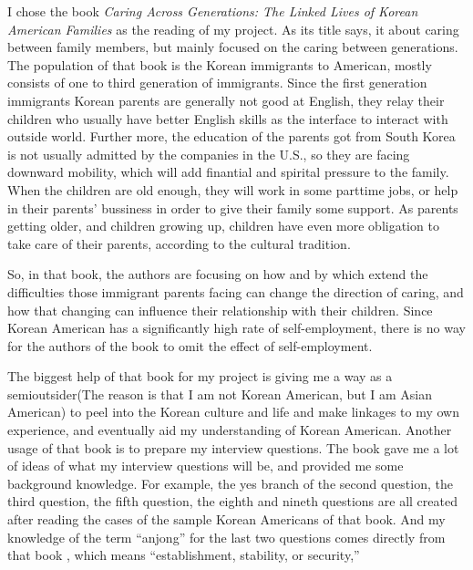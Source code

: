 I chose the book \emph{Caring Across Generations: The Linked Lives of Korean
American Families} as the reading of my project. As its title says, it about
caring between family members, but mainly focused on the caring between
generations. The population of that book is the Korean immigrants to American,
mostly consists of one to third generation of immigrants. Since the first
generation immigrants Korean parents are generally not good at English, they
relay their children who usually have better English skills as the interface to
interact with outside world. Further more, the education of the parents got from
South Korea is not usually admitted by the companies in the U.S., so they are
facing downward mobility, which will add finantial and spirital pressure to the
family. When the children are old enough, they will work in some parttime jobs,
or help in their parents' bussiness in order to give their family some support.
As parents getting older, and children growing up, children have even more
obligation to take care of their parents, according to the cultural tradition.
\par
So, in that book, the authors are focusing on how and by which extend the
difficulties those immigrant parents facing can change the direction of
caring, and how that changing can influence their relationship with their
children. Since Korean American has a significantly high rate of
self-employment, there is no way for the authors of the book to omit the effect
of self-employment.
\par
The biggest help of that book for my project is giving me a way as a
semioutsider(The reason is that I am not Korean American, but I am Asian
American) to peel into the Korean culture and life and make linkages to my own
experience, and eventually aid my understanding of Korean American. Another
usage of that book is to prepare my interview questions. The book gave me a lot
of ideas of what my interview questions will be, and provided me some background
knowledge. For example, the yes branch of the second question, the third
question, the fifth question, the eighth and nineth questions are all created
after reading the cases of the sample Korean Americans of that book. And my
knowledge of the term ``anjong'' for the last two questions comes directly from
that book \cite[p.~40, p.~41]{book:ISelected}, which means ``establishment,
stability, or security,''
